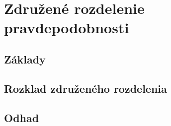 \chapter{Združené rozdelenie pravdepodobnosti}\label{sec:joint_dist}

\section{Základy}\label{sec:zaklady}
\section{Rozklad združeného rozdelenia}\label{sec:kopule}
\section{Odhad}\label{sec:odhad}